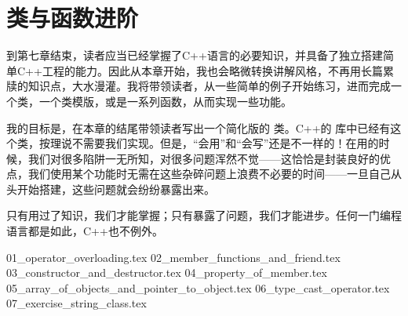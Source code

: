 \chapter{类与函数进阶}
到第七章结束，读者应当已经掌握了C++语言的必要知识，并具备了独立搭建简单C++工程的能力。因此从本章开始，我也会略微转换讲解风格，不再用长篇累牍的知识点，大水漫灌。我将带领读者，从一些简单的例子开始练习，进而完成一个类，一个类模版，或是一系列函数，从而实现一些功能。\par
我的目标是，在本章的结尾带领读者写出一个简化版的 \lstinline@string@ 类。C++的 \lstinline@string@ 库中已经有这个类，按理说不需要我们实现。但是，``会用''和``会写''还是不一样的！在用的时候，我们对很多陷阱一无所知，对很多问题浑然不觉——这恰恰是封装良好的优点，我们使用某个功能时无需在这些杂碎问题上浪费不必要的时间——一旦自己从头开始搭建，这些问题就会纷纷暴露出来。\par
只有用过了知识，我们才能掌握；只有暴露了问题，我们才能进步。任何一门编程语言都是如此，C++也不例外。\par
{01_operator_overloading.tex}
{02_member_functions_and_friend.tex}
{03_constructor_and_destructor.tex}
{04_property_of_member.tex}
{05_array_of_objects_and_pointer_to_object.tex}
{06_type_cast_operator.tex}
{07_exercise_string_class.tex}
